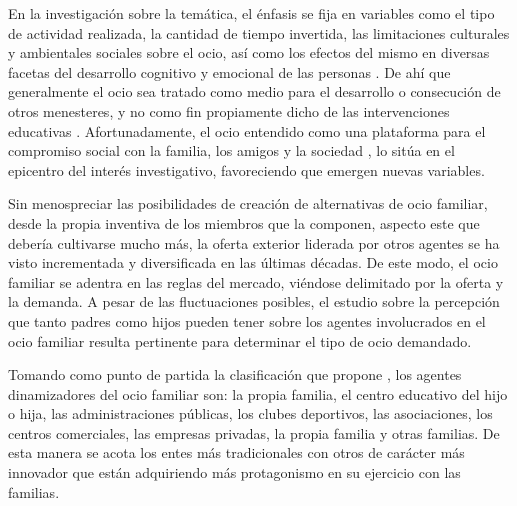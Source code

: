 \documentclass[spanish]{textolivre}
\begin{document}
En la investigación sobre la temática, el énfasis se fija en variables como el tipo de actividad realizada, la cantidad de tiempo invertida, las limitaciones culturales y ambientales sociales sobre el ocio, así como los efectos del mismo en diversas facetas del desarrollo cognitivo y emocional de las personas \cite{newman2014}. De ahí que generalmente el ocio sea tratado como medio para el desarrollo o consecución de otros menesteres, y no como fin propiamente dicho de las intervenciones educativas \cite{chen2018}. Afortunadamente, el ocio entendido como una plataforma para el compromiso social con la familia, los amigos y la sociedad \cite{kelly2012}, lo sitúa en el epicentro del interés investigativo, favoreciendo que emergen nuevas variables. 

Sin menospreciar las posibilidades de creación de alternativas de ocio familiar, desde la propia inventiva de los miembros que la componen, aspecto este que debería cultivarse mucho más, la oferta exterior liderada por otros agentes se ha visto incrementada y diversificada en las últimas décadas. De este modo, el ocio familiar se adentra en las reglas del mercado, viéndose delimitado por la oferta y la demanda. A pesar de las fluctuaciones posibles, el estudio sobre la percepción que tanto padres como hijos pueden tener sobre los agentes involucrados en el ocio familiar resulta pertinente para determinar el tipo de ocio demandado. 

Tomando como punto de partida la clasificación que propone \textcite{alvarez2020}, los agentes dinamizadores del ocio familiar son: la propia familia, el centro educativo del hijo o hija, las administraciones públicas, los clubes deportivos, las asociaciones, los centros comerciales, las empresas privadas, la propia familia y otras familias. De esta manera se acota los entes más tradicionales con otros de carácter más innovador que están adquiriendo más protagonismo en su ejercicio con las familias. 
\end{document}
